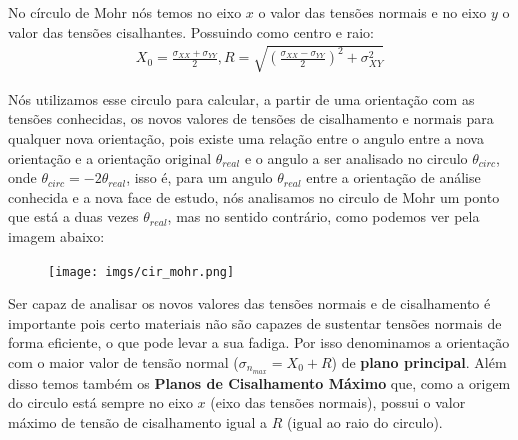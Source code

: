 \documentclass{article}
\begin{document}
No círculo de Mohr nós temos no eixo $x$ o valor das tensões normais e no eixo $y$ o valor das tensões cisalhantes. Possuindo como centro e raio:
\begin{align*}
    X_0 = \frac{\sigma_{XX} + \sigma_{YY}}{2}, R = \sqrt{\left(\frac{\sigma_{XX} - \sigma_{YY}}{2}\right)^2 + \sigma^2_{XY}}
\end{align*}

Nós utilizamos esse circulo para calcular, a partir de uma orientação com as tensões conhecidas, os novos valores de tensões de cisalhamento e normais para qualquer nova orientação, pois existe uma relação entre o angulo entre a nova orientação e a orientação original $\theta_{real}$ e o angulo a ser analisado no circulo $\theta_{circ}$, onde $\theta_{circ} = -2\theta_{real}$, isso é, para um angulo $\theta_{real}$ entre a orientação de análise conhecida e a nova face de estudo, nós analisamos no circulo de Mohr um ponto que está a duas vezes $\theta_{real}$, mas no sentido contrário, como podemos ver pela imagem abaixo:
\begin{figure}[h]
    \centering
    \texttt{[image: imgs/cir\_mohr.png]}
\end{figure}

Ser capaz de analisar os novos valores das tensões normais e de cisalhamento é importante pois certo materiais não são capazes de sustentar tensões normais de forma eficiente, o que pode levar a sua fadiga. Por isso denominamos a orientação com o maior valor de tensão normal ($ \sigma_{n_{max}} = X_0 + R$) de \textbf{plano principal}. Além disso temos também os \textbf{Planos de Cisalhamento Máximo} que, como a origem do circulo está sempre no eixo $x$ (eixo das tensões normais), possui o valor máximo de tensão de cisalhamento igual a $R$ (igual ao raio do circulo).
\end{document}
